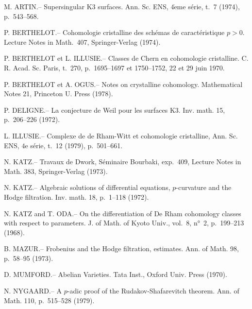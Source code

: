 \documentclass[12pt,a4paper]{article}
\theoremstyle{plain}
\theoremstyle{definition}
\theoremstyle{remark}
\begin{document}
\begin{enumerate}[label={[\arabic*]}, leftmargin=2em, itemsep=0.3em]
\item M. ARTIN.-- Supersingular K3 surfaces. Ann. Sc. ENS, $4\mathrm{\grave{e}me}$ série, t.~7 (1974), p.~543--568.

\item P. BERTHELOT.-- Cohomologie cristalline des schémas de caractéristique $p > 0$. Lecture Notes in Math.~407, Springer-Verlag (1974).

\item P. BERTHELOT et L. ILLUSIE.-- Classes de Chern en cohomologie cristalline. C. R. Acad. Sc. Paris, t.~270, p.~1695--1697 et 1750--1752, 22 et 29 juin 1970.

\item P. BERTHELOT et A. OGUS.-- Notes on crystalline cohomology. Mathematical Notes 21, Princeton U. Press (1978).

\item P. DELIGNE.-- La conjecture de Weil pour les surfaces K3. Inv. math. 15, p.~206--226 (1972).

\item L. ILLUSIE.-- Complexe de de Rham-Witt et cohomologie cristalline, Ann. Sc. ENS, $4\mathrm{e}$ série, t.~12 (1979), p.~501--661.

\item N. KATZ.-- Travaux de Dwork, Séminaire Bourbaki, exp.~409, Lecture Notes in Math. 383, Springer-Verlag (1973).

\item N. KATZ.-- Algebraic solutions of differential equations, $p$-curvature and the Hodge filtration. Inv. math. 18, p.~1--118 (1972).

\item N. KATZ and T. ODA.-- On the differentiation of De Rham cohomology classes with respect to parameters. J. of Math. of Kyoto Univ., vol.~8, n°~2, p.~199--213 (1968).

\item[$\text{[10]}$] B. MAZUR.-- Frobenius and the Hodge filtration, estimates. Ann. of Math. 98, p.~58--95 (1973).

\item[$\text{[11]}$] D. MUMFORD.-- Abelian Varieties. Tata Inst., Oxford Univ. Press (1970).

\item[$\text{[12]}$] N. NYGAARD.-- A $p$-adic proof of the Rudakov-Shafarevitch theorem. Ann. of Math. 110, p.~515--528 (1979).


\end{enumerate}
\end{document}
